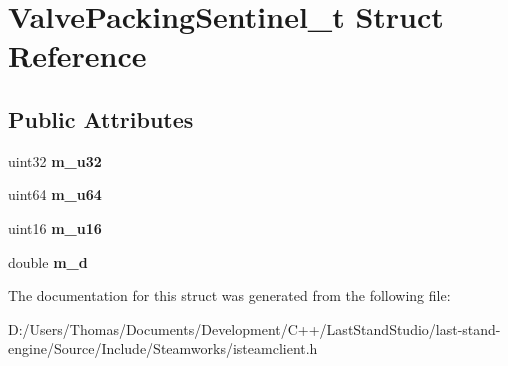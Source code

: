 \hypertarget{structValvePackingSentinel__t}{}\section{Valve\+Packing\+Sentinel\+\_\+t Struct Reference}
\label{structValvePackingSentinel__t}
\subsection*{Public Attributes}
\begin{DoxyCompactItemize}
\item 
\hypertarget{structValvePackingSentinel__t_ab819aaafb3580dd23b3222b1c5056248}{}uint32 {\bfseries m\+\_\+u32}\label{structValvePackingSentinel__t_ab819aaafb3580dd23b3222b1c5056248}

\item 
\hypertarget{structValvePackingSentinel__t_acb1beb7a7b8fe0801493ae8f5f3b79e4}{}uint64 {\bfseries m\+\_\+u64}\label{structValvePackingSentinel__t_acb1beb7a7b8fe0801493ae8f5f3b79e4}

\item 
\hypertarget{structValvePackingSentinel__t_ada6ef77e510a74821bed3ae0a089affa}{}uint16 {\bfseries m\+\_\+u16}\label{structValvePackingSentinel__t_ada6ef77e510a74821bed3ae0a089affa}

\item 
\hypertarget{structValvePackingSentinel__t_a6455d7b7d81dde6582fe654baa417da8}{}double {\bfseries m\+\_\+d}\label{structValvePackingSentinel__t_a6455d7b7d81dde6582fe654baa417da8}

\end{DoxyCompactItemize}


The documentation for this struct was generated from the following file\+:\begin{DoxyCompactItemize}
\item 
D\+:/\+Users/\+Thomas/\+Documents/\+Development/\+C++/\+Last\+Stand\+Studio/last-\/stand-\/engine/\+Source/\+Include/\+Steamworks/isteamclient.\+h\end{DoxyCompactItemize}
